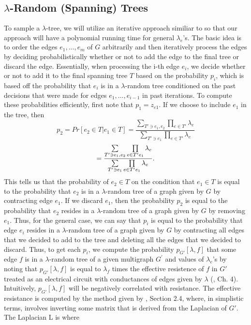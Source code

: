 \documentclass[oneside]{projectpaper} %
\begin{document}
\subsection{$\lambda$-Random (Spanning) Trees}
To sample a $\lambda$-tree, we will utilize an iterative approach similiar to \cite{VGK90} so that our approach will have a polynomial running time for general $\lambda_e$'s. The basic idea is to order the edges $e_1,...,e_m$ of $G$ arbitrarily and then iteratively process the edges by deciding probabilistically whether or not to add the edge to the final tree or discard the edge. Essentially, when processing the i-th edge $e_i$, we decide whether or not to add it to the final spanning tree $T$ based on the probability $p_i$, which is based off the probability that $e_i$ is in a $\lambda$-random tree conditioned on the past decisions that were made for edges $e_1,...,e_{i-1}$ in past iterations. To compute these probabilities efficiently, first note that $p_1 = z_{e1}$. If we choose to include $e_1$ in the tree, then
\begin{equation*}
p_2 = Pr[e_2 \in T | e_1 \in T] = \frac{\sum\limits_{T' \ni e_1, e_2}\prod\limits_{e \in T'}\lambda_e}{\sum\limits_{T' \ni e_1}\prod\limits_{e \in T'}\lambda_e}
\end{equation*}
\begin{equation*}
= \frac{\sum\limits_{T' \ni e_1, e_2}\prod\limits_{e \in T'\\e_1}\lambda_e}{\sum\limits_{T' \ni e_1}\prod\limits_{e \in T'\\e_1}\lambda_e}.
\end{equation*}
This tells us that the probability of $e_2 \in T$ on the condition that $e_1 \in T$ is equal to the probability that $e_2$ is in a $\lambda$-random tree of a graph given by $G$ by contracting edge $e_1$. If we discard $e_1$, then the probability $p_2$ is equal to the probability that $e_2$ resides in a $\lambda$-random tree of a graph given by $G$ by removing $e_1$. Thus, for the general case, we can say that $p_i$ is equal to the probability that edge $e_i$ resides in a $\lambda$-random tree of a graph given by $G$ by contracting all edges that we decided to add to the tree and deleting all the edges that we decided to discard. Thus, to get each $p_i$, we compute the probability $p_{G'}[\lambda,f]$ that some edge $f$ is in a $\lambda$-random tree of a given multigraph $G^{'}$ and values of $\lambda_e$'s by noting that $p_{G'}[\lambda,f]$ is equal to $\lambda_f$ times the effective resistence of $f$ in $G'$ treated as an electrical circuit with conductances of edges given by $\lambda$ (\cite{LP14}, Ch. 4). Intuitively, $p_{G'}[\lambda,f]$ will be negatively correlated with resistance. The effective resistance is computed by the method given by \cite{GBS08}, Section 2.4, where, in simplistic terms, involves inverting some matrix that is derived from the Laplacian of $G'$. The Laplacian L is where
\end{document}

